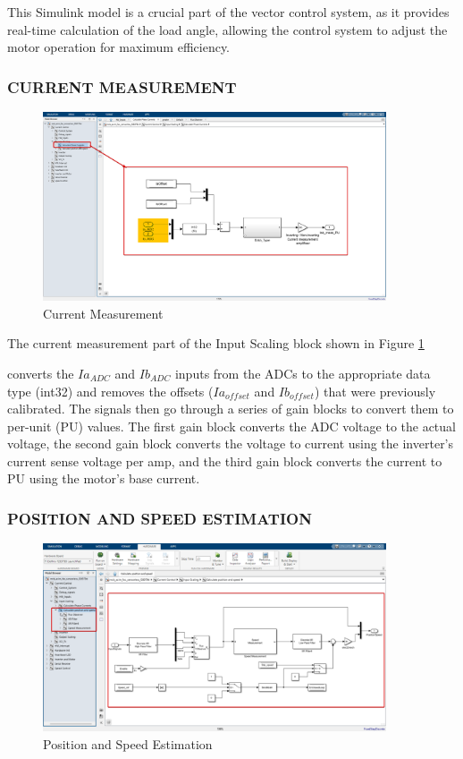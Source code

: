 This Simulink model is a crucial part of the vector control system, as it provides real-time calculation of the load angle, allowing the control system to adjust the motor operation for maximum efficiency.


\subsubsection{CURRENT MEASUREMENT}


\begin{figure}[H]
	\centering
	\includegraphics[width=4in]{sections/section3/images/simulation/inputScaling/currentMeasurement.png}
	\caption{Current Measurement}
	\label{fig:current_measurement}
\end{figure}


The current measurement part of the Input Scaling block shown in Figure \ref{fig:current_measurement}

converts the $Ia_{ADC}$ and $Ib_{ADC}$ inputs from the ADCs to the appropriate data type (int32) and removes the offsets ($Ia_{offset}$ and $Ib_{offset}$) that were previously calibrated. The signals then go through a series of gain blocks to convert them to per-unit (PU) values. The first gain block converts the ADC voltage to the actual voltage, the second gain block converts the voltage to current using the inverter's current sense voltage per amp, and the third gain block converts the current to PU using the motor's base current.


\subsubsection{POSITION AND SPEED ESTIMATION}



\begin{figure}[H]
	\centering
	\includegraphics[width=4in]{sections/section3/images/simulation/inputScaling/fluxObserver.png}
	\caption{Position and Speed Estimation}
	\label{fig:position_speed_estimation}
\end{figure}



